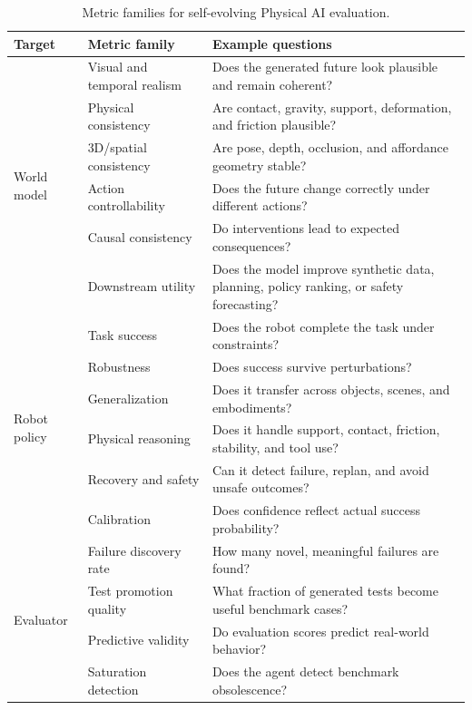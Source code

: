 \documentclass[sigconf,review,anonymous]{acmart}
\begin{document}
\begin{table}[t]
\centering
\caption{Metric families for self-evolving Physical AI evaluation.}
\label{tab:metrics}
\small
\begin{tabular}{p{}p{}p{}}
\toprule
\textbf{Target} & \textbf{Metric family} & \textbf{Example questions} \\
\midrule
\multirow{6}{*}{World model}
& Visual and temporal realism & Does the generated future look plausible and remain coherent? \\
& Physical consistency & Are contact, gravity, support, deformation, and friction plausible? \\
& 3D/spatial consistency & Are pose, depth, occlusion, and affordance geometry stable? \\
& Action controllability & Does the future change correctly under different actions? \\
& Causal consistency & Do interventions lead to expected consequences? \\
& Downstream utility & Does the model improve synthetic data, planning, policy ranking, or safety forecasting? \\
\midrule
\multirow{6}{*}{Robot policy}
& Task success & Does the robot complete the task under constraints? \\
& Robustness & Does success survive perturbations? \\
& Generalization & Does it transfer across objects, scenes, and embodiments? \\
& Physical reasoning & Does it handle support, contact, friction, stability, and tool use? \\
& Recovery and safety & Can it detect failure, replan, and avoid unsafe outcomes? \\
& Calibration & Does confidence reflect actual success probability? \\
\midrule
\multirow{4}{*}{Evaluator}
& Failure discovery rate & How many novel, meaningful failures are found? \\
& Test promotion quality & What fraction of generated tests become useful benchmark cases? \\
& Predictive validity & Do evaluation scores predict real-world behavior? \\
& Saturation detection & Does the agent detect benchmark obsolescence? \\
\bottomrule
\end{tabular}
\end{table}
\end{document}
